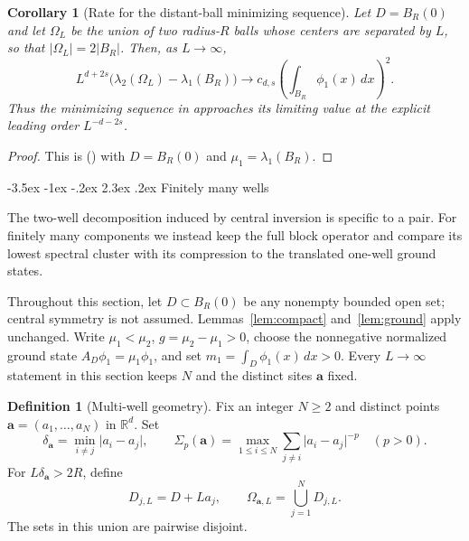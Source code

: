 \documentclass[twoside,10pt]{article}
\makeatletter
\numberwithin{equation}{section}
\theoremstyle{slbody}
\newtheorem{corollary}[theorem]{Corollary}
\theoremstyle{definition}
\newtheorem{definition}[theorem]{Definition}
\newcommand{\R}{\mathbb{R}}
\newcommand{\abs}[1]{\lvert #1\rvert}
\renewcommand{\section}{%
  \@startsection{section}{1}{\z@}%
    {-3.5ex \@plus -1ex \@minus -.2ex}%
    {2.3ex \@plus .2ex}%
    {\normalfont\large\bfseries}}
\renewcommand{\eqref}[1]{%
  \textup{{\normalfont(\oldstylenums{\ref{#1}}}\normalfont)}}
\makeatother
\begin{document}
\begin{corollary}[Rate for the distant-ball minimizing sequence]
\label{cor:distant-ball}
Let $D=B_R(0)$ and let $\Omega_L$ be the union of two radius-$R$ balls whose
centers are separated by $L$, so that $\abs{\Omega_L}=2\abs{B_R}$.  Then, as
$L\to\infty$,
\[
 L^{d+2s}\bigl(\lambda_2(\Omega_L)-\lambda_1(B_R)\bigr)
 \longrightarrow c_{d,s}
 \left(\int_{B_R}\phi_1(x)\,dx\right)^2.
\]
Thus the minimizing sequence in
\cite[Theorem~6.2]{BrascoParini2016} approaches its limiting value at the
explicit leading order $L^{-d-2s}$.
\end{corollary}

\begin{proof}
This is \eqref{eq:lambda2} with $D=B_R(0)$ and
$\mu_1=\lambda_1(B_R)$.
\end{proof}

\section{Finitely many wells}\label{sec:multi-well}

The two-well decomposition induced by central inversion is specific to a pair.
For finitely many components we instead keep the full block operator and
compare its lowest spectral cluster with its compression to the translated
one-well ground states.

Throughout this section, let $D\subset B_R(0)$ be any nonempty bounded open
set; central symmetry is not assumed.  Lemmas~\ref{lem:compact}
and~\ref{lem:ground} apply unchanged.  Write
$\mu_1<\mu_2$, $g=\mu_2-\mu_1>0$, choose the nonnegative normalized ground
state $A_D\phi_1=\mu_1\phi_1$, and set
$m_1=\int_D\phi_1(x)\,dx>0$.
Every $L\to\infty$ statement in this section keeps $N$ and the distinct sites
$\mathbf a$ fixed.

\begin{definition}[Multi-well geometry]\label{def:multi-geometry}
Fix an integer $N\geq2$ and distinct points
$\mathbf a=(a_1,\dots,a_N)$ in $\R^d$.  Set
\begin{equation}\label{eq:geometry-constants}
 \delta_{\mathbf a}=\min_{i\ne j}\abs{a_i-a_j},
 \qquad
 \Sigma_p(\mathbf a)
 =\max_{1\leq i\leq N}\sum_{j\ne i}\abs{a_i-a_j}^{-p}
 \quad (p>0).
\end{equation}
For $L\delta_{\mathbf a}>2R$, define
\begin{equation}\label{eq:multi-domain}
 D_{j,L}=D+La_j,
 \qquad
 \Omega_{\mathbf a,L}=\bigcup_{j=1}^N D_{j,L}.
\end{equation}
The sets in this union are pairwise disjoint.
\end{definition}
\end{document}
